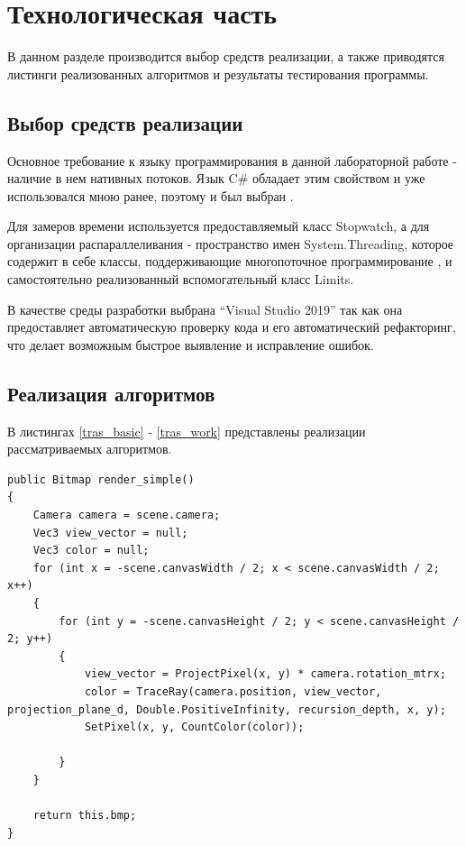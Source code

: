 \chapter{Технологическая часть}

В данном разделе производится выбор средств реализации, а также приводятся листинги реализованных алгоритмов и результаты тестирования программы.


\section{Выбор средств реализации}

Основное требование к языку программирования в данной лабораторной работе - наличие в нем нативных потоков. Язык C\# обладает этим свойством и уже использовался мною ранее, поэтому и был выбран  \cite{CBook}. 

Для замеров времени используется предоставляемый класс Stopwatch, а для организации распараллеливания - пространство имен System.Threading, которое содержит в себе классы, поддерживающие многопоточное программирование \cite{CBook}, и самостоятельно реализованный вспомогательный класс Limits.

В качестве среды разработки выбрана “Visual Studio 2019” так как она предоставляет автоматическую проверку кода и его автоматический рефакторинг, что делает возможным быстрое выявление и исправление ошибок.


\section{Реализация алгоритмов}

\lstset{style=sharpc}

В листингах \ref{tras_basic} - \ref{tras_work} представлены реализации рассматриваемых алгоритмов.

\begin{lstlisting}[caption=Реализация  последовательного алгоритма трассировки лучей,
	label={tras_basic}]
public Bitmap render_simple()
{
	Camera camera = scene.camera;
	Vec3 view_vector = null;
	Vec3 color = null;
	for (int x = -scene.canvasWidth / 2; x < scene.canvasWidth / 2; x++)
	{
		for (int y = -scene.canvasHeight / 2; y < scene.canvasHeight / 2; y++)
		{
			view_vector = ProjectPixel(x, y) * camera.rotation_mtrx;
			color = TraceRay(camera.position, view_vector, projection_plane_d, Double.PositiveInfinity, recursion_depth, x, y);
			SetPixel(x, y, CountColor(color));
			
		}
	}
	
	return this.bmp;
}
\end{lstlisting}


